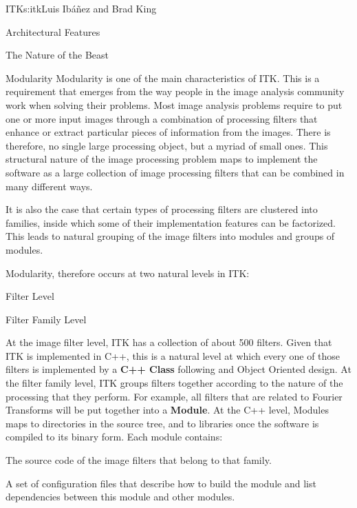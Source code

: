 \begin{aosachapter}{ITK}{s:itk}{Luis Ib\'{a}\~{n}ez and Brad King}
\begin{aosasect1}{Architectural Features}
\begin{aosasect2}{The Nature of the Beast}
\end{aosasect2}

\begin{aosasect2}{Modularity}
Modularity is one of the main characteristics of ITK. This is a requirement
that emerges from the way people in the image analysis community work when
solving their problems. Most image analysis problems require to put one or more
input images through a combination of processing filters that enhance or
extract particular pieces of information from the images. There is therefore,
no single large processing object, but a myriad of small ones. This structural
nature of the image processing problem maps to implement the software as a
large collection of image processing filters that can be combined in many
different ways.

It is also the case that certain types of processing filters are clustered into
families, inside which some of their implementation features can be factorized.
This leads to natural grouping of the image filters into modules and groups of
modules.

Modularity, therefore occurs at two natural levels in ITK:

\begin{aosaitemize}
\item Filter Level
\item Filter Family Level
\end{aosaitemize}

At the image filter level, ITK has a collection of about 500 filters. Given
that ITK is implemented in C++, this is a natural level at which every one of
those filters is implemented by a \textbf{C++ Class} following and Object
Oriented design.  At the filter family level, ITK groups filters together
according to the nature of the processing that they perform. For example, all
filters that are related to Fourier Transforms will be put together into a
\textbf{Module}.  At the C++ level, Modules maps to directories in the source
tree, and to libraries once the software is compiled to its binary form. Each
module contains:

\begin{aosaenumerate}

\item The source code of the image filters that belong to that family.

\item A set of configuration files that describe how to build the module and
list dependencies between this module and other modules.


\end{aosaenumerate}
\end{aosasect2}
\end{aosasect1}
\end{aosachapter}
